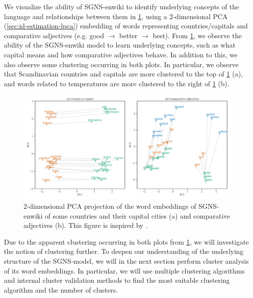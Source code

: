 We visualize the ability of SGNS-enwiki to identify underlying concepts of the language and relationships between them in \cref{fig:sgns-enwiki-word-to-word-relations-pca-2d}, using a 2-dimensional PCA (\cref{sec:id-estimation-lpca}) embedding of words representing countries/capitals and comparative adjectives (e.g. good $\rightarrow$ better $\rightarrow$ best). From \cref{fig:sgns-enwiki-word-to-word-relations-pca-2d}, we observe the ability of the SGNS-enwiki model to learn underlying concepts, such as what capital means and how comparative adjectives behave. In addition to this, we also observe some clustering occurring in both plots. In particular, we observe that Scandinavian countries and capitals are more clustered to the top of \cref{fig:sgns-enwiki-word-to-word-relations-pca-2d} (a), and words related to temperatures are more clustered to the right of \cref{fig:sgns-enwiki-word-to-word-relations-pca-2d} (b).
\begin{figure}[H]
   \centering
   \includegraphics[width=\textwidth]{thesis/figures/word-to-word-relationships-pca-2d.pdf}
 \caption{2-dimensional PCA projection of the word embeddings of SGNS-enwiki of some countries and their capital cities (a) and comparative adjectives (b). This figure is inspired by \cite[Figure 2]{mikolov2013b}.}
 \label{fig:sgns-enwiki-word-to-word-relations-pca-2d}
\end{figure}

Due to the apparent clustering occurring in both plots from \cref{fig:sgns-enwiki-word-to-word-relations-pca-2d}, we will investigate the notion of clustering further. To deepen our understanding of the underlying structure of the SGNS-model, we will in the next section perform cluster analysis of its word embeddings. In particular, we will use multiple clustering algorithms and internal cluster validation methods to find the most suitable clustering algorithm and the number of clusters.